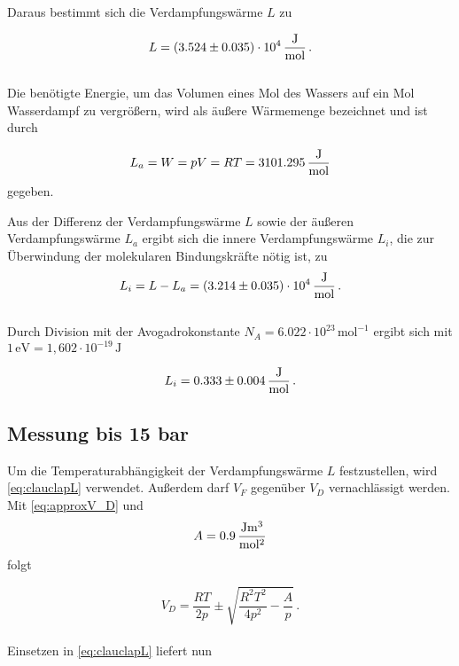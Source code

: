 Daraus bestimmt sich die Verdampfungswärme $L$ zu

\begin{equation*}
  L = (3.524 \pm 0.035) \cdot 10^4 \,\unit{\frac{\joule}{\mol}} \,.
\end{equation*} \\

Die benötigte Energie, um das Volumen eines Mol des Wassers auf ein Mol Wasserdampf zu vergrößern, wird
als äußere Wärmemenge bezeichnet und ist durch

\begin{equation*}
  L_a = W = pV = RT = 3101.295 \,\unit{\frac{\joule}{\mol}}
  \label{eq:äußereVW}
\end{equation*} gegeben.

Aus der Differenz der Verdampfungswärme $L$ sowie der äußeren Verdampfungswärme $L_a$ ergibt sich die
innere Verdampfungswärme $L_i$, die zur Überwindung der molekularen Bindungskräfte nötig ist, zu 
\begin{equation*}
  L_i = L - L_a = (3.214 \pm 0.035) \cdot 10^4 \,\unit{\frac{\joule}{\mol}} \,.
  \label{eq:innereVW}
\end{equation*} \\

Durch Division mit der Avogadrokonstante $N_A = 6.022 \cdot 10^{23} \,\unit{\mol}^{-1}$ ergibt sich
mit $1 \,\unit{\electronvolt} = 1,602 \cdot 10^{-19} \,\unit{\joule}$

\begin{equation*}
  L_i = 0.333 \pm 0.004 \,\unit{\frac{\joule}{\mol}} \,.
\end{equation*}

\subsection{Messung bis 15 bar}
Um die Temperaturabhängigkeit der Verdampfungswärme $L$ festzustellen, wird \eqref{eq:clauclapL} verwendet.
Außerdem darf $V_F$ gegenüber $V_D$ vernachlässigt werden.
Mit \eqref{eq:approxV_D} und 
\begin{equation*}
  A = 0.9 \,\unit{\frac{\joule\cubic\meter}{\square\mol}}
\end{equation*} folgt

\begin{equation*}
  V_D = \frac{RT}{2p} \pm \sqrt{\frac{R^2 T^2}{4 p^2} - \frac{A}{p}}\,.
\end{equation*} \\

Einsetzen in \eqref{eq:clauclapL} liefert nun

